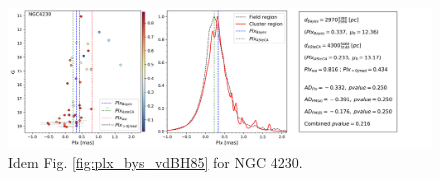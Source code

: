 \documentclass[referee]{aa}
\begin{document}
\begin{figure}[ht]
    \centering
    \includegraphics[width=\hsize]{../figs/plx_NGC4230.png}
    \caption{Idem Fig. \ref{fig:plx_bys_vdBH85} for NGC 4230.}
    \label{fig62}
\end{figure}
\end{document}
